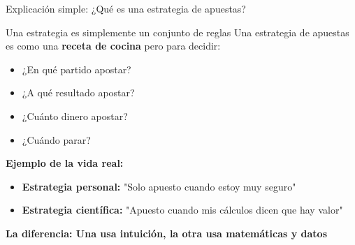 \documentclass[aspectratio=169]{beamer}
\begin{document}
\begin{frame}{Explicación simple: ¿Qué es una estrategia de apuestas?}
\begin{block}{Una estrategia es simplemente un conjunto de reglas}
Una estrategia de apuestas es como una \textbf{receta de cocina} pero para decidir:
\begin{itemize}
\item ¿En qué partido apostar?
\item ¿A qué resultado apostar?
\item ¿Cuánto dinero apostar?
\item ¿Cuándo parar?
\end{itemize}
\end{block}

\vspace{0.5cm}

\textbf{Ejemplo de la vida real:}
\begin{itemize}
\item \textcolor{azulprincipal}{\textbf{Estrategia personal:}} "Solo apuesto cuando estoy muy seguro"
\item \textcolor{verdeganancia}{\textbf{Estrategia científica:}} "Apuesto cuando mis cálculos dicen que hay valor"
\end{itemize}

\vspace{0.3cm}
\begin{center}
\textbf{La diferencia: Una usa intuición, la otra usa matemáticas y datos}
\end{center}
\end{frame}
\end{document}
